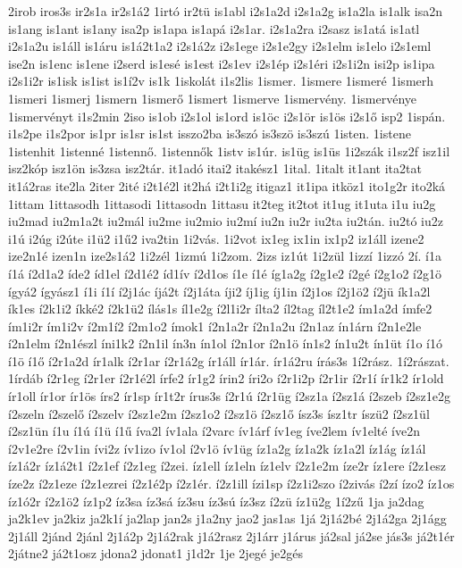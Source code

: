 {2irob
iros3s
ir2s1a
ir2s1á2
1irtó
ir2tü
is1abl
i2s1a2d
i2s1a2g
is1a2la
is1alk
isa2n
is1ang
is1ant
is1any
isa2p
is1apa
is1apá
i2s1ar.
i2s1a2ra
i2sasz
is1atá
is1atl
i2s1a2u
is1áll
is1áru
is1á2t1a2
i2s1á2z
i2s1ege
i2s1e2gy
i2s1elm
is1elo
i2s1eml
ise2n
is1enc
is1ene
i2serd
is1esé
is1est
i2s1ev
i2s1ép
i2s1éri
i2s1i2n
isi2p
is1ipa
i2s1i2r
is1isk
is1ist
is1í2v
is1k
1iskolát
i1s2lis
1ismer.
1ismere
1ismeré
1ismerh
1ismeri
1ismerj
1ismern
1ismerő
1ismert
1ismerve
1ismervény.
1ismervénye
1ismervényt
i1s2min
2iso
is1ob
i2s1ol
is1ord
is1öc
i2s1ör
is1ös
i2s1ő
isp2
1ispán.
i1s2pe
i1s2por
is1pr
is1sr
is1st
isszo2ba
is3szó
is3szö
is3szú
1isten.
1istene
1istenhit
1istenné
1istennő.
1istennők
1istv
is1úr.
is1üg
is1üs
1i2szák
i1sz2f
isz1il
isz2kóp
isz1ön
is3zsa
isz2tár.
it1adó
itai2
itakész1
1ital.
1italt
it1ant
ita2tat
it1á2ras
ite2la
2iter
2ité
i2t1é2l
it2há
i2t1i2g
itigaz1
it1ipa
itköz1
ito1g2r
ito2ká
1ittam
1ittasodh
1ittasodi
1ittasodn
1ittasu
it2teg
it2tot
it1ug
it1uta
i1u
iu2g
iu2mad
iu2m1a2t
iu2mál
iu2me
iu2mio
iu2mí
iu2n
iu2r
iu2ta
iu2tán.
iu2tó
iu2z
i1ú
i2úg
i2úte
i1ü2
i1ű2
iva2tin
1i2vás.
1i2vot
ix1eg
ix1in
ix1p2
iz1áll
izene2
ize2n1é
izen1n
ize2s1á2
1i2zél
1izmú
1i2zom.
2izs
iz1út
1i2zül
1izzí
1izzó
2í.
í1a
í1á
í2d1a2
íde2
íd1el
í2d1é2
íd1ív
í2d1os
í1e
í1é
íg1a2g
í2g1e2
í2gé
í2g1o2
í2g1ö
ígyá2
ígyász1
í1i
í1í
í2j1ác
íjá2t
í2j1áta
íji2
íj1ig
íj1in
í2j1os
í2j1ö2
í2jü
ík1a2l
ík1es
í2k1i2
íkké2
í2k1ü2
ílás1s
íl1e2g
í2l1i2r
ílta2
íl2tag
íl2t1e2
ím1a2d
ímfe2
ím1i2r
ím1i2v
í2m1í2
í2m1o2
ímok1
í2n1a2r
í2n1a2u
í2n1az
ín1árn
í2n1e2le
í2n1elm
í2n1észl
íni1k2
í2n1il
ín3n
ín1ol
í2n1or
í2n1ö
ín1s2
ín1u2t
ín1üt
í1o
í1ó
í1ö
í1ő
í2r1a2d
ír1alk
í2r1ar
í2r1á2g
ír1áll
ír1ár.
ír1á2ru
írás3s
1í2rász.
1í2rászat.
1írdáb
í2r1eg
í2r1er
í2r1é2l
írfe2
ír1g2
írin2
íri2o
í2r1i2p
í2r1ir
í2r1í
ír1k2
ír1old
ír1oll
ír1or
ír1ös
írs2
ír1sp
ír1t2r
írus3s
í2r1ú
í2r1üg
í2sz1a
í2sz1á
í2szeb
í2sz1e2g
í2szeln
í2szelő
í2szelv
í2sz1e2m
í2sz1o2
í2sz1ö
í2sz1ő
ísz3s
ísz1tr
íszü2
í2sz1ül
í2sz1ün
í1u
í1ú
í1ü
í1ű
íva2l
ív1ala
í2varc
ív1árf
ív1eg
íve2lem
ív1elté
íve2n
í2v1e2re
í2v1in
ívi2z
ív1izo
ív1ol
í2v1ö
ív1üg
íz1a2g
íz1a2k
íz1a2l
íz1ág
íz1ál
íz1á2r
íz1á2t1
í2z1ef
í2z1eg
í2zei.
íz1ell
íz1eln
íz1elv
í2z1e2m
íze2r
íz1ere
í2z1esz
íze2z
í2z1eze
í2z1ezrei
í2z1é2p
í2z1ér.
í2z1ill
ízi1sp
í2z1i2szo
í2zivás
í2zí
ízo2
íz1os
íz1ó2r
í2z1ö2
íz1p2
íz3sa
íz3sá
íz3su
íz3sú
íz3sz
í2zü
íz1ü2g
1í2zű
1ja
ja2dag
ja2k1ev
ja2kiz
ja2k1í
ja2lap
jan2s
j1a2ny
jao2
jas1as
1já
2j1á2bé
2j1á2ga
2j1ágg
2j1áll
2jánd
2jánl
2j1á2p
2j1á2rak
j1á2rasz
2j1árr
j1árus
já2sal
já2se
jás3s
já2t1ér
2játne2
já2t1osz
jdona2
jdonat1
j1d2r
1je
2jegé
je2gés
}
